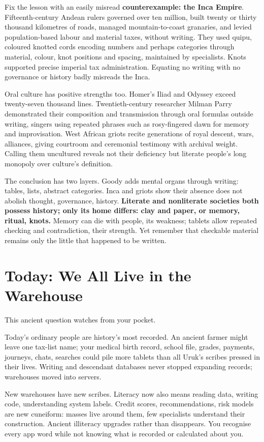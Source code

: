 Fix the lesson with an easily misread \textbf{counterexample: the Inca Empire}. Fifteenth-century Andean rulers governed over ten million, built twenty or thirty thousand kilometres of roads, managed mountain-to-coast granaries, and levied population-based labour and material taxes, without writing. They used quipu, coloured knotted cords encoding numbers and perhaps categories through material, colour, knot positions and spacing, maintained by specialists. Knots supported precise imperial tax administration. Equating no writing with no governance or history badly misreads the Inca.

Oral culture has positive strengths too. Homer's Iliad and Odyssey exceed twenty-seven thousand lines. Twentieth-century researcher Milman Parry demonstrated their composition and transmission through oral formulas outside writing, singers using repeated phrases such as rosy-fingered dawn for memory and improvisation. West African griots recite generations of royal descent, wars, alliances, giving courtroom and ceremonial testimony with archival weight. Calling them uncultured reveals not their deficiency but literate people's long monopoly over culture's definition.

The conclusion has two layers. Goody adds mental organs through writing: tables, lists, abstract categories. Inca and griots show their absence does not abolish thought, governance, history. \textbf{Literate and nonliterate societies both possess history; only its home differs: clay and paper, or memory, ritual, knots.} Memory can die with people, its weakness; tablets allow repeated checking and contradiction, their strength. Yet remember that checkable material remains only the little that happened to be written.

\section{Today: We All Live in the Warehouse}
This ancient question watches from your pocket.

Today's ordinary people are history's most recorded. An ancient farmer might leave one tax-list name; your medical birth record, school file, grades, payments, journeys, chats, searches could pile more tablets than all Uruk's scribes pressed in their lives. Writing and descendant databases never stopped expanding records; warehouses moved into servers.

New warehouses have new scribes. Literacy now also means reading data, writing code, understanding system labels. Credit scores, recommendations, risk models are new cuneiform: masses live around them, few specialists understand their construction. Ancient illiteracy upgrades rather than disappears. You recognise every app word while not knowing what is recorded or calculated about you.

